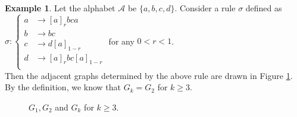 \documentclass[a4]{amsart}
\theoremstyle{definition}
\newtheorem{ex}[theorem]{Example}
\begin{document}
 
 \begin{ex}\label{Example5.2}
Let the alphabet $\mathcal{A}$ be $\{a,b,c,d\}$. Consider a rule $\sigma$ defined as 
\quad\\
$\sigma: \left\{\begin{aligned}
a&\longrightarrow [a]_{r}bca\\
b&\longrightarrow bc\\
c&\longrightarrow d[a]_{1-r}\\
d&\longrightarrow [a]_rbc[a]_{1-r}\\
\end{aligned}
\right.
$ for any $0< r< 1$.
\\

Then the adjacent graphs determined by the above rule are drawn in Figure \ref{Ex2-Gk}.  By the definition, we know that $G_k=G_2$ for $k\geq 3$.

\begin{figure}[h] %
\hskip 0.1cm 
\caption{$G_1, G_2$ and $G_k$  for $k\geq 3$.} \label{Ex2-Gk}


\end{figure}
\end{ex}
\end{document}

